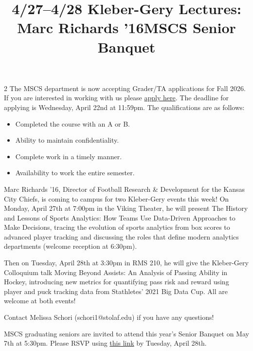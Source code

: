 \documentclass[12pt]{article}
\newcommand{\bolder}{\textbf}
\begin{document}
\begin{multicols}{2}
The MSCS department is now accepting Grader/TA applications for Fall 2026. If you are interested in working with us please \href{https://forms.gle/c9Rw2DAwuYA8vBtM9}{apply here}. The deadline for applying is Wednesday, April 22nd at 11:59pm. The qualifications are as follows: 

 \begin{itemize}
    \item Completed the course with an A or B.
    \item Ability to maintain confidentiality.
    \item Complete work in a timely manner.
    \item Availability to work the entire semester.
\end{itemize} 

\begin{tcolorbox}[colback=white, colframe=black]
    \begin{center}
    \title{{\large \bolder{4/27--4/28 Kleber-Gery Lectures: Marc Richards '16}}}
    \end{center}
\end{tcolorbox}

Marc Richards '16, Director of Football Research \& Development for the Kansas City Chiefs, is coming to campus for two Kleber-Gery events this week! On Monday, April 27th at 7:00pm in the Viking Theater, he will present The History and Lessons of Sports Analytics: How Teams Use Data-Driven Approaches to Make Decisions, tracing the evolution of sports analytics from box scores to advanced player tracking and discussing the roles that define modern analytics departments (welcome reception at 6:30pm). 

Then on Tuesday, April 28th at 3:30pm in RMS 210, he will give the Kleber-Gery Colloquium talk Moving Beyond Assists: An Analysis of Passing Ability in Hockey, introducing new metrics for quantifying pass risk and reward using player and puck tracking data from Stathletes' 2021 Big Data Cup. All are welcome at both events!

Contact Melissa Schori (schori1@stolaf.edu) if you have any questions!

\begin{tcolorbox}[colback=white, colframe=black]
    \begin{center}
    \title{{\large \bolder{MSCS Senior Banquet}}}
    \end{center}
\end{tcolorbox}

MSCS graduating seniors are invited to attend this year's Senior Banquet on May 7th at 5:30pm. Please RSVP using \href{https://docs.google.com/forms/d/e/1FAIpQLScgOKI8CBUjdAlBOWogwo_QmVcTVVHmFHDOw5-bzeL7vT30CQ/viewform}{this link} by Tuesday, April 28th. 


\end{multicols}
\end{document}
